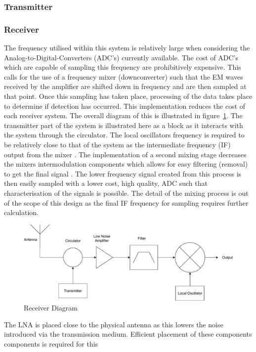 \documentclass[11pt]{witseiepaper}
\begin{document}
\subsubsection{Transmitter} \label{sec:Transmitter}

\subsubsection{Receiver} \label{sec:Receiver}
The frequency utilised within this system is relatively large when considering the Analog-to-Digital-Converters (ADC's) currently available. The cost of ADC's which are capable of sampling this frequency are prohibitively expensive.
This calls for the use of a frequency mixer (downconverter) such that the EM waves received by the amplifier are shifted down in frequency and are then sampled at that point. Once this sampling has taken place, processing of the data takes place to determine if detection has occurred.
This implementation reduces the cost of each receiver system. The overall diagram of this is illustrated in figure~\ref{fig:ReceiverDiagram}. The transmitter part of the system is illustrated here as a block as it interacts with the system through the circulator. The local oscillators frequency is required to be relatively close to that of the system as the intermediate frequency (IF) output from the mixer \cite[p.~397-398]{radarHandbook}. 
The implementation of a second mixing stage decreases the mixers intermodulation components which allows for easy filtering (removal) to get the final signal \cite[p.~398]{radarHandbook}.
The lower frequency signal created from this process is then easily sampled with a lower cost, high quality, ADC such that characterisation of the signals is possible. The detail of the mixing process is out of the scope of this design as the final IF frequency for sampling requires further calculation.

\begin{center}
    \begin{figure}
        \includegraphics[width=\textwidth]{ReceiverDiagram.pdf}
        \caption{Receiver Diagram}
        \label{fig:ReceiverDiagram}    
    \end{figure}
\end{center}
The LNA is placed close to the physical antenna as this lowers the noise introduced via the transmission medium. Efficient placement of these components components is required for this 
\end{document}
